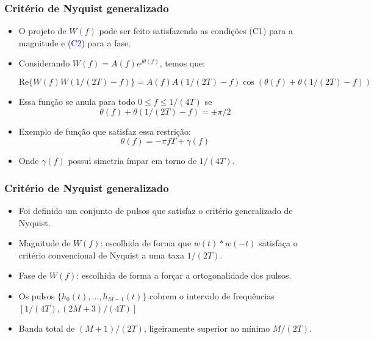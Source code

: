 \begin{frame}
	\frametitle{Critério de Nyquist generalizado}

	\begin{itemize}
	    \item O projeto de $W(f)$ pode ser feito satisfazendo as condições (\textcolor{blue}{C1}) para a magnitude e (\textcolor{blue}{C2}) para a fase.
	    \item Considerando $W(f) = A(f) e^{j\theta(f)}$, temos que:
	    \begin{small}
	    \begin{equation*}
		  \mathrm{Re}\{W(f) W(1/(2T)-f) \} = A(f)A(1/(2T)-f)\cos\left(\theta(f)+\theta(1/(2T)-f) \right)
	    \end{equation*}
	    \end{small}
	    \item Essa função se anula para todo $0\leq f \leq 1/(4T)$ se
	    \begin{equation*}
		  \theta(f) + \theta(1/(2T)-f) = \pm \pi/2
	    \end{equation*}
	    \item Exemplo de função que satisfaz essa restrição:
	    \begin{equation*}
		  \theta(f) = -\pi fT + \gamma(f)
	    \end{equation*}
	    \item Onde $\gamma(f)$ possui simetria ímpar em torno de $1/(4T)$.
	\end{itemize}	
\end{frame}

\begin{frame}
	\frametitle{Critério de Nyquist generalizado}

	\begin{itemize}
	    \item Foi definido um conjunto de pulsos que satisfaz o critério generalizado de Nyquist.
	    \item Magnitude de $W(f)$: escolhida de forma que $w(t)*w(-t)$ satisfaça o critério convencional de Nyquist a uma taxa $1/(2T)$.
	    \item Fase de $W(f)$: escolhida de forma a forçar a ortogonalidade dos pulsos.
	    \item Os pulsos $\{h_0(t),\ldots,h_{M-1}(t) \}$ cobrem o intervalo de frequências $[1/(4T), (2M+3)/(4T)]$
	    \item Banda total de $(M+1)/(2T)$, ligeiramente superior ao mínimo $M/(2T)$.
	\end{itemize}	
\end{frame}

